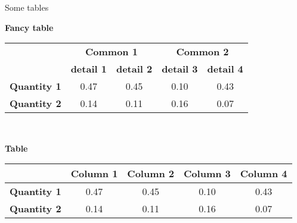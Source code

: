\documentclass[talk.tex]{subfiles}
\begin{document}
    \begin{frame}{Some tables}

	{\large\centering\textbf{Fancy table}\\}
	\centering
	\begin{tabular}{lcccc}
	    \toprule
	& \multicolumn{2}{c}{{\textbf{Common 1}}} & \multicolumn{2}{c}{\textbf{Common 2}} \\
	    \cmidrule(lr){2-3} \cmidrule(lr){4-5}
	   & \textbf{detail 1} & \textbf{detail 2} & \textbf{detail 3} & \textbf{detail 4} \\
	    \midrule
	     \textbf{Quantity 1} & 0.47 & 0.45 & 0.10 & 0.43 \\
	     \textbf{Quantity 2} & 0.14 & 0.11 & 0.16 & 0.07 \\
	    \bottomrule
	\end{tabular}\\

	\bigskip
	\bigskip

	{\large\centering\textbf{Table}\\}
	\centering
	\begin{tabular}{lcccc}
	    \toprule
	& \textbf{Column 1} & \textbf{Column 2} & \textbf{Column 3} & \textbf{Column 4} \\
	    \midrule
	     \textbf{Quantity 1} & 0.47 & 0.45 & 0.10 & 0.43 \\
	     \textbf{Quantity 2} & 0.14 & 0.11 & 0.16 & 0.07 \\
	    \bottomrule
	\end{tabular}
    \end{frame}
\end{document}
